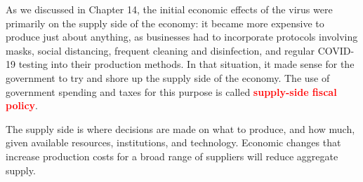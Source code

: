\documentclass[11pt]{article} %
\begin{document}
As we discussed in Chapter 14, the initial economic effects of the virus were primarily on the supply side of the economy: it became more expensive to produce just about anything, as businesses had to incorporate protocols involving masks, social distancing, frequent cleaning and disinfection, and regular COVID-19 testing into their production methods. In that situation, it made sense for the government to try and shore up the supply side of the economy. The use of government spending and taxes for this purpose is called \textbf{\textcolor{red}{supply-side fiscal policy}}.

The supply side is where decisions are made on what to produce, and how much, given available resources, institutions, and technology. Economic changes that increase production costs for a broad range of suppliers will reduce aggregate supply.
\end{document}
